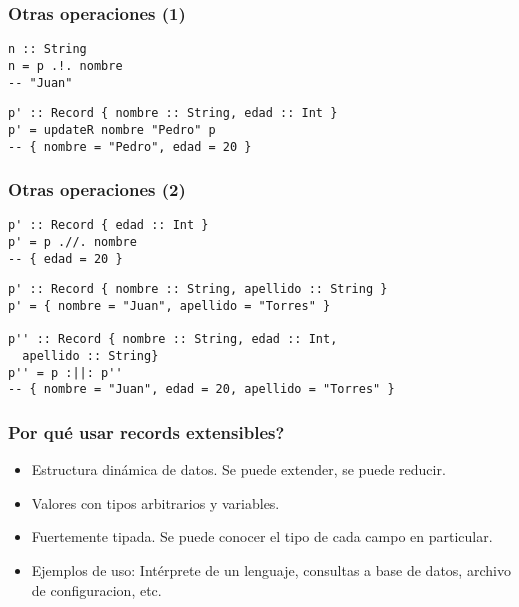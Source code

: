 \documentclass{beamer}
\begin{document}
\begin{frame}[fragile]
\frametitle{Otras operaciones (1)}

\begin{example}[Lookup]
\begin{verbatim}
n :: String
n = p .!. nombre
-- "Juan"
\end{verbatim}
\end{example}

\pause

\begin{example}[Update]
\begin{verbatim}
p' :: Record { nombre :: String, edad :: Int }
p' = updateR nombre "Pedro" p
-- { nombre = "Pedro", edad = 20 }
\end{verbatim}
\end{example}

\end{frame}

\begin{frame}[fragile]
\frametitle{Otras operaciones (2)}

\begin{example}[Delete]
\begin{verbatim}
p' :: Record { edad :: Int }
p' = p .//. nombre
-- { edad = 20 }
\end{verbatim}
\end{example}

\pause

\begin{example}[Union]
\begin{verbatim}
p' :: Record { nombre :: String, apellido :: String }
p' = { nombre = "Juan", apellido = "Torres" }

p'' :: Record { nombre :: String, edad :: Int,
  apellido :: String}
p'' = p :||: p''
-- { nombre = "Juan", edad = 20, apellido = "Torres" }
\end{verbatim}
\end{example}

\end{frame}

\begin{frame}
\frametitle{Por qué usar records extensibles?}

\begin{itemize}
\item Estructura dinámica de datos. Se puede extender, se puede reducir.
\item Valores con tipos arbitrarios y variables.
\item Fuertemente tipada. Se puede conocer el tipo de cada campo en particular.
\item Ejemplos de uso: Intérprete de un lenguaje, consultas a base de datos, archivo de configuracion, etc.
\end{itemize}

\end{frame}
\end{document}
